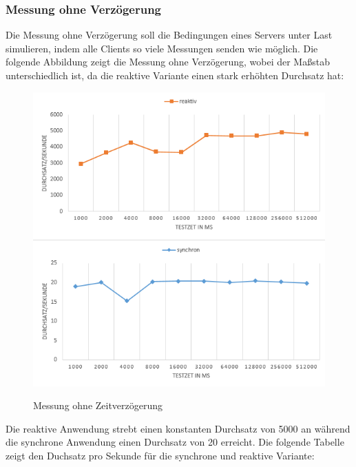 \clearpage
\subsubsection{Messung ohne Verzögerung}
Die Messung ohne Verzögerung soll die Bedingungen eines Servers unter Last simulieren, indem alle Clients so viele Messungen senden wie möglich. Die folgende Abbildung zeigt die Messung ohne Verzögerung, wobei der Maßstab unterschiedlich ist, da die reaktive Variante einen stark erhöhten Durchsatz hat: 

\begin{center}
\begin{figure}[H]
	\caption{Messung ohne Zeitverzögerung}
	\centering
  	\includegraphics[width=\textwidth]{media/messung_ohne_delay}
	\label{messung_ohne_delay}
\end{figure}
\end{center}

Die reaktive Anwendung strebt einen konstanten Durchsatz von 5000 an während die synchrone Anwendung einen Durchsatz von 20 erreicht. Die folgende Tabelle zeigt den Duchsatz pro Sekunde für die synchrone und reaktive Variante:

